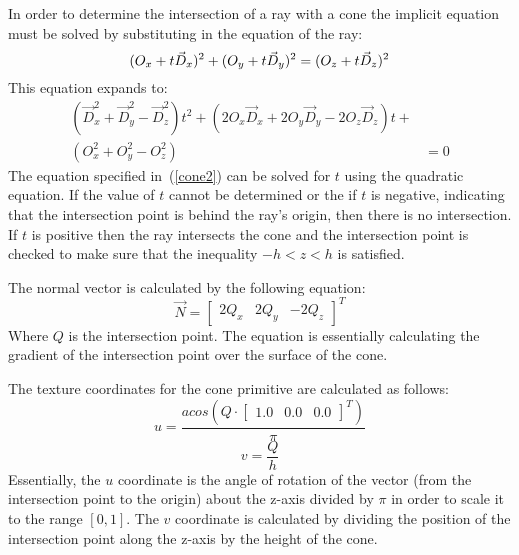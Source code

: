 In order to determine the intersection of a ray with a cone the implicit
equation must be solved by substituting in the equation of the ray:
\begin{equation}
  (O_{x} + t\vec{D}_{x})^2 + (O_{y} + t\vec{D}_{y})^2 = \\
  (O_{z} + t\vec{D}_{z})^2
\end{equation}
This equation expands to:
\begin{equation}
\begin{split}
  (\vec{D}_{x}^2 + \vec{D}_{y}^2 - \vec{D}_{z}^2)t^2 + (2O_{x}\vec{D}_{x} + 
  2O_{y}\vec{D}_{y} - 2O_{z}\vec{D}_{z})t + \\
  (O_{x}^2 + O_{y}^2 - O_{z}^2) &= 0\label{cone2}
\end{split}
\end{equation}
The equation specified in~(\ref{cone2}) can be solved for $t$ using the
quadratic equation. If the value of $t$ cannot be determined or the if $t$ is
negative, indicating that the intersection point is behind the ray's origin,
then there is no intersection. If $t$ is positive then the ray intersects the
cone and the intersection point is checked to make sure that the inequality $-h
< z < h$ is satisfied.

The normal vector is calculated by the following equation:
\begin{equation}
  \vec{N} = \begin{bmatrix} 2Q_{x} & 2Q_{y} & -2Q_{z}
  \end{bmatrix}^{T}
\end{equation}
Where $Q$ is the intersection point. The equation is essentially calculating the
gradient of the intersection point over the surface of the cone.

The texture coordinates for the cone primitive are calculated as follows:
\begin{equation}
  u = \frac{acos(Q \cdot \begin{bmatrix} 1.0 & 0.0 & 0.0 \end{bmatrix}^{T})}
  {\pi}
\end{equation}
\begin{equation}
  v = \frac{Q}{h}
\end{equation}
Essentially, the $u$ coordinate is the angle of rotation of the vector (from
the intersection point to the origin) about the z-axis divided by $\pi$ in 
order to scale it to the range $[0, 1]$. The $v$ coordinate is calculated by
dividing the position of the intersection point along the z-axis by the height
of the cone.

